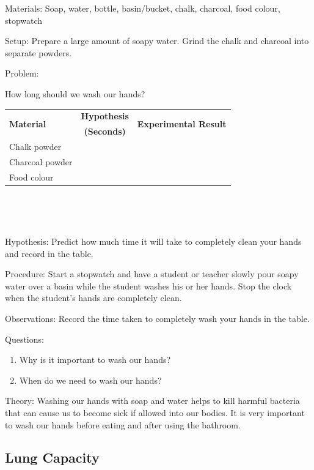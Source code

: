 \begin{description*}
\item[Materials:]{Soap, water, bottle, basin/bucket, chalk, charcoal, food colour, stopwatch}
\item[Setup:]{Prepare a large amount of soapy water. Grind the chalk and charcoal into separate powders.}\\
\item[Problem:]{How long should we wash our hands?\\

\begin{tabular}{|l|c|c|} \hline
\multirow{2}{*}{\textbf{Material}} & \textbf{Hypothesis} & \multirow{2}{*}{\textbf{Experimental Result}} \\
& \textbf{(Seconds)} & \\ \hline
Chalk powder & & \\ \hline
Charcoal powder & & \\ \hline
Food colour & & \\ \hline
\end{tabular} \\[10pt]
}\\
\item[Hypothesis:]{Predict how much time it will take to completely clean your hands and record in the table.}
\item[Procedure:]{Start a stopwatch and have a student or teacher slowly pour soapy water over a basin while the student washes his or her hands. Stop the clock when the student's hands are completely clean.}
\item[Observations:]{Record the time taken to completely wash your hands in the table.}
\item[Questions:]{}\hfill
\begin{enumerate}
\item Why is it important to wash our hands?
\item When do we need to wash our hands?
\end{enumerate}
\item[Theory:]{Washing our hands with soap and water helps to kill harmful bacteria that can cause us to become sick if allowed into our bodies. It is very important to wash our hands before eating and after using the bathroom.}
\end{description*}

\pagebreak


\subsection{Lung Capacity}

